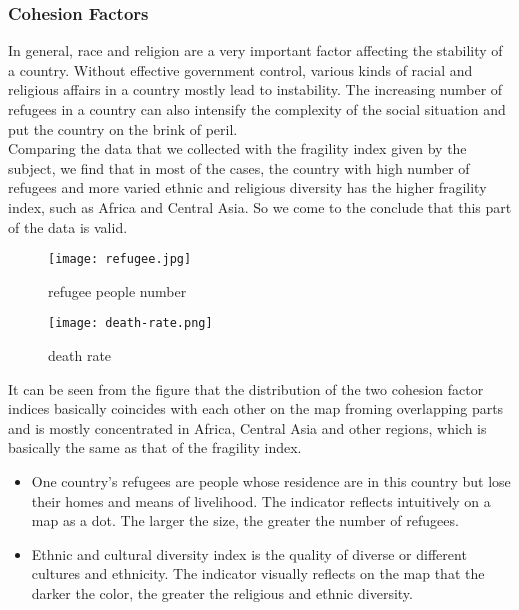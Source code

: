\documentclass{mcmthesis}
\begin{document}
\subsubsection{Cohesion Factors}
In general, race and religion are a very important factor affecting the stability of a country. Without effective government control, various kinds of racial and religious affairs in a country mostly lead to instability. The increasing number of refugees in a country can also intensify the complexity of the social situation and put the country on the brink of peril.\\
Comparing the data that we collected with the fragility index given by the subject, we find that in most of the cases, the country with high number of refugees and more varied ethnic and religious diversity has the higher fragility index, such as Africa and Central Asia. So we come to the conclude that this part of the data is valid.\\
\begin{figure}[h]
  \centering
  \begin{minipage}[h]{0.48\textwidth}
  \centering
  \texttt{[image: refugee.jpg]}
  \caption{refugee people number}
  \end{minipage}
  \begin{minipage}[h]{0.48\textwidth}
  \centering
  \texttt{[image: death-rate.png]}
  \caption{death rate}
  \end{minipage}
\end{figure}
\newpage
It can be seen from the figure that the distribution of the two cohesion factor indices basically coincides with each other on the map froming overlapping parts and is mostly concentrated in Africa, Central Asia and other regions, which is basically the same as that of the fragility index.
\begin{itemize}
  \item One country's refugees are people whose residence are in this country but lose their homes and means of livelihood. The indicator reflects intuitively on a map as a dot. The larger the size, the greater the number of refugees.
  \item Ethnic and cultural diversity index is the quality of diverse or different cultures and ethnicity. The indicator visually reflects on the map that the darker the color, the greater the religious and ethnic diversity.
\end{itemize}
\end{document}
